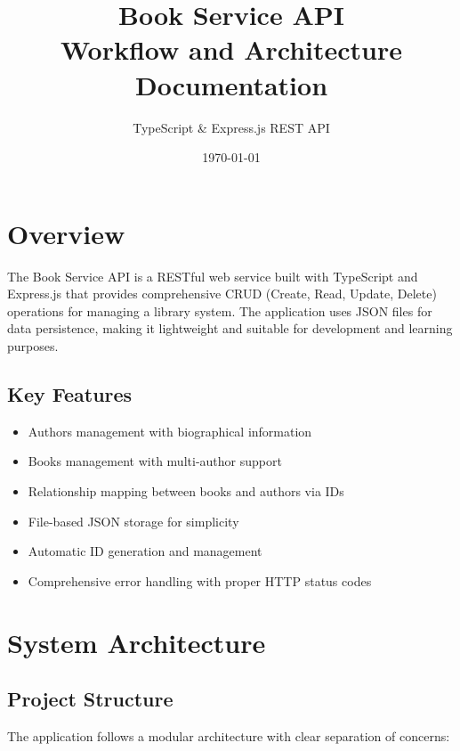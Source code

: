 \documentclass[11pt,a4paper]{article}
\title{\textbf{Book Service API}\\ \large{Workflow and Architecture Documentation}}
\author{TypeScript \& Express.js REST API}
\date{\today}
\begin{document}
\maketitle

\tableofcontents
\newpage

\section{Overview}
The Book Service API is a RESTful web service built with TypeScript and Express.js that provides comprehensive CRUD (Create, Read, Update, Delete) operations for managing a library system. The application uses JSON files for data persistence, making it lightweight and suitable for development and learning purposes.

\subsection{Key Features}
\begin{itemize}
    \item Authors management with biographical information
    \item Books management with multi-author support
    \item Relationship mapping between books and authors via IDs
    \item File-based JSON storage for simplicity
    \item Automatic ID generation and management
    \item Comprehensive error handling with proper HTTP status codes
\end{itemize}

\section{System Architecture}

\subsection{Project Structure}
The application follows a modular architecture with clear separation of concerns:
\end{document}
